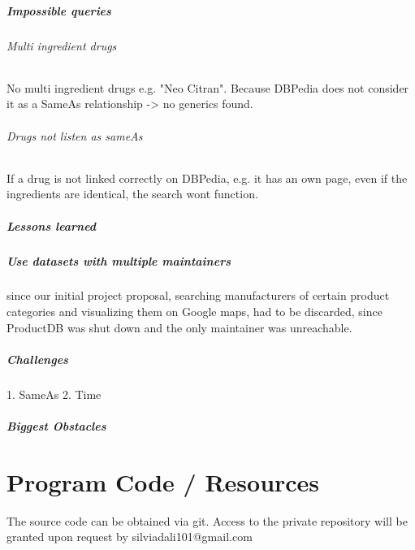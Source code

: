 \documentclass[11pt,titlepage,oneside,openany]{book}
\begin{document}
\paragraph{Impossible queries}
\label{sec:unquery}
\subparagraph{Multi ingredient drugs}No multi ingredient drugs e.g. "Neo Citran". Because DBPedia does not consider it as a SameAs relationship -> no generics found.

\subparagraph{Drugs not listen as sameAs}
If a drug is not linked correctly on DBPedia, e.g. it has an own page, even if the ingredients are identical, the search wont function.


\paragraph{Lessons learned}
\label{cha:lessons}


\paragraph{Use datasets with multiple maintainers} since our initial project proposal, searching manufacturers of certain product categories and visualizing them on Google maps, had to be discarded, since ProductDB was shut down and the only maintainer was unreachable.


\paragraph{Challenges}
\label{sec:challenges}

1. SameAs 
2. Time

\paragraph{Biggest Obstacles}
\label{sec:obstacle}

\label{sec:idea}



\appendix

\chapter{Program Code / Resources}
\label{cha:appendix-a}

The source code can be obtained via git. Access to the private repository will be granted upon request by silviadali101@gmail.com



\newpage
\end{document}
